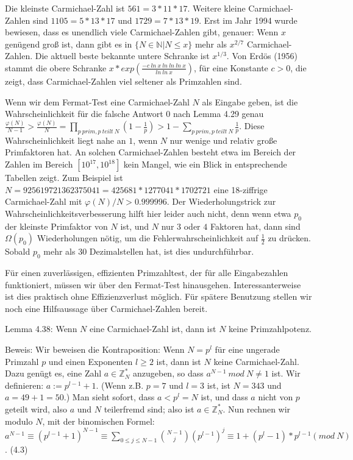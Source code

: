 \documentclass[a4paper]{article}
\begin{document}
\begin{multicols}{3}
        Die kleinste Carmichael-Zahl ist $561 = 3* 11 *17$. Weitere kleine Carmichael-Zahlen sind $1105 = 5* 13 *17$ und $1729 = 7* 13 *19$. Erst im Jahr 1994 wurde bewiesen, dass es unendlich viele Carmichael-Zahlen gibt, genauer: Wenn $x$ genügend groß ist, dann gibt es in $\{N\in\mathbb{N}| N\leq x\}$ mehr als $x^{2/7}$ Carmichael-Zahlen. Die aktuell beste bekannte untere Schranke ist $x^{1/3}$. Von Erdös (1956) stammt die obere Schranke $x*exp(\frac{-c\ ln\ x\ ln\ ln\ ln\ x}{ln\ ln\ x})$, für eine Konstante $c>0$, die zeigt, dass Carmichael-Zahlen viel seltener als Primzahlen sind.

        Wenn wir dem Fermat-Test eine Carmichael-Zahl $N$ als Eingabe geben, ist die Wahrscheinlichkeit für die falsche Antwort $0$ nach Lemma 4.29 genau $\frac{\varphi(N)}{N-1} > \frac{\varphi(N)}{N} = \prod_{p\ prim, p\ teilt\ N} (1 -\frac{1}{p})> 1 -\sum_{p\ prim, p\ teilt\ N} \frac{1}{p}$.
        Diese Wahrscheinlichkeit liegt nahe an $1$, wenn $N$ nur wenige und relativ große Primfaktoren hat. An solchen Carmichael-Zahlen besteht etwa im Bereich der Zahlen im Bereich $[10^{17} , 10^{18} ]$ kein Mangel, wie ein Blick in entsprechende Tabellen zeigt. Zum Beispiel ist $N=925619721362375041 = 425681* 1277041 *1702721$ eine 18-ziffrige Carmichael-Zahl mit $\varphi(N)/N > 0.999996$.
        Der Wiederholungstrick zur Wahrscheinlichkeitsverbesserung hilft hier leider auch nicht, denn wenn etwa $p_0$ der kleinste Primfaktor von $N$ ist, und $N$ nur $3$ oder $4$ Faktoren hat, dann sind $\Omega(p_0)$ Wiederholungen nötig, um die Fehlerwahrscheinlichkeit auf $\frac{1}{2}$ zu drücken. Sobald $p_0$ mehr als 30 Dezimalstellen hat, ist dies undurchführbar.

        Für einen zuverlässigen, effizienten Primzahltest, der für alle Eingabezahlen funktioniert, müssen wir über den Fermat-Test hinausgehen. Interessanterweise ist dies praktisch ohne Effizienzverlust möglich. Für spätere Benutzung stellen wir noch eine Hilfsaussage über Carmichael-Zahlen bereit.

        Lemma 4.38: Wenn $N$ eine Carmichael-Zahl ist, dann ist $N$ keine Primzahlpotenz.

        Beweis: Wir beweisen die Kontraposition: Wenn $N=p^l$ für eine ungerade Primzahl $p$ und einen Exponenten $l\geq 2$ ist, dann ist $N$ keine Carmichael-Zahl. Dazu genügt es, eine Zahl $a\in\mathbb{Z}^*_N$ anzugeben, so dass $a^{N-1}\ mod\ N\not= 1$ ist. Wir definieren: $a:=p^{l-1} + 1$. (Wenn z.B. $p=7$ und $l=3$ ist, ist $N=343$ und $a=49+1=50$.) Man sieht sofort, dass $a<p^l=N$ ist, und dass $a$ nicht von $p$ geteilt wird, also $a$ und $N$ teilerfremd sind; also ist $a\in\mathbb{Z}^*_N$. Nun rechnen wir modulo $N$, mit der binomischen Formel: $a^{N-1} \equiv (p^{l-1} + 1)^{N-1} \equiv \sum_{0 \leq j\leq N-1} \binom{N-1}{j} (p^{l-1})^j \equiv 1 + (p^l-1)*p^{l-1} (mod\ N)$. (4.3)


\end{multicols}
\end{document}
